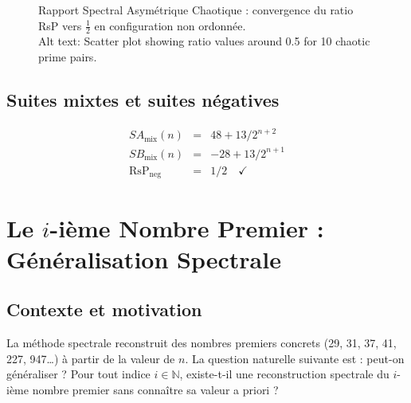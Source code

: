 \documentclass[]{pasj02}
\begin{document}
\begin{figure}
  \begin{center}
  \end{center}
  \caption{Rapport Spectral Asymétrique Chaotique : convergence du ratio RsP
    vers $\tfrac{1}{2}$ en configuration non ordonnée.\\
    Alt text: Scatter plot showing ratio values around 0.5 for 10 chaotic
    prime pairs.}
  \label{fig:rsp_chaotique}
\end{figure}

\subsection{Suites mixtes et suites négatives}
\label{ssec:mixtes}
\label{hol:suites_mixtes_negatives}

\begin{eqnarray}
  SA_{\mathrm{mix}}(n) &=& 48 + 13/2^{n+2} \\
  SB_{\mathrm{mix}}(n) &=& -28 + 13/2^{n+1} \\
  \mathrm{RsP}_{\mathrm{neg}} &=& 1/2 \quad\checkmark
\end{eqnarray}

\section{Le $i$-ième Nombre Premier : Généralisation Spectrale}
\label{sec:generalisation}

\subsection{Contexte et motivation}
\label{ssec:contexte}

La méthode spectrale reconstruit des nombres premiers concrets (29, 31, 37,
41, 227, 947\ldots) à partir de la valeur de $n$.  La question naturelle
suivante est : peut-on généraliser ?  Pour tout indice $i \in \mathbb{N}$,
existe-t-il une reconstruction spectrale du $i$-ième nombre premier sans
connaître sa valeur a priori ?
\end{document}
